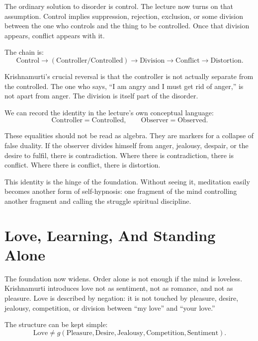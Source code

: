 The ordinary solution to disorder is control. The lecture now turns on that assumption. Control implies suppression, rejection, exclusion, or some division between the one who controls and the thing to be controlled. Once that division appears, conflict appears with it.

The chain is:
\begin{equation}
\mathrm{Control}
\longrightarrow
(\mathrm{Controller}/\mathrm{Controlled})
\longrightarrow
\mathrm{Division}
\longrightarrow
\mathrm{Conflict}
\longrightarrow
\mathrm{Distortion}.
\end{equation}

Krishnamurti's crucial reversal is that the controller is not actually separate from the controlled. The one who says, ``I am angry and I must get rid of anger,'' is not apart from anger. The division is itself part of the disorder.

We can record the identity in the lecture's own conceptual language:
\begin{equation}
\mathrm{Controller}=\mathrm{Controlled},
\qquad
\mathrm{Observer}=\mathrm{Observed}.
\end{equation}

These equalities should not be read as algebra. They are markers for a collapse of false duality. If the observer divides himself from anger, jealousy, despair, or the desire to fulfil, there is contradiction. Where there is contradiction, there is conflict. Where there is conflict, there is distortion.

\begin{remark}
This identity is the hinge of the foundation. Without seeing it, meditation easily becomes another form of self-hypnosis: one fragment of the mind controlling another fragment and calling the struggle spiritual discipline.
\end{remark}

\section{Love, Learning, And Standing Alone}

The foundation now widens. Order alone is not enough if the mind is loveless. Krishnamurti introduces love not as sentiment, not as romance, and not as pleasure. Love is described by negation: it is not touched by pleasure, desire, jealousy, competition, or division between ``my love'' and ``your love.''

The structure can be kept simple:
\begin{equation}
\mathrm{Love}
\neq
g(\mathrm{Pleasure},\mathrm{Desire},\mathrm{Jealousy},\mathrm{Competition},\mathrm{Sentiment}).
\end{equation}

